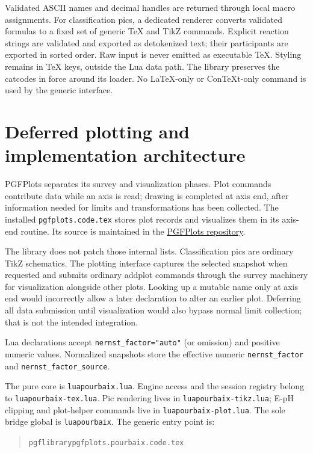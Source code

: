 \documentclass[a4paper,11pt]{ltxdoc}
\begin{document}
Validated ASCII names and decimal handles are returned through local macro
assignments. For classification pics, a dedicated renderer converts validated
formulas to a fixed set of generic TeX and TikZ commands. Explicit reaction strings are validated and exported as detokenized text;
their participants are exported in sorted order. Raw input is never
emitted as executable TeX. Styling remains in TeX keys, outside the Lua data path.
The library preserves the catcodes in force around its loader. No LaTeX-only or
ConTeXt-only command is used by the generic interface.

\section{Deferred plotting and implementation architecture}
PGFPlots separates its survey and visualization phases. Plot commands contribute
data while an axis is read; drawing is completed at axis end, after information
needed for limits and transformations has been collected. The installed
\texttt{pgfplots.code.tex} stores plot records and visualizes them in its axis-end
routine. Its source is maintained in the
\href{https://github.com/pgf-tikz/pgfplots}{PGFPlots repository}.

The library does not patch those internal lists. Classification pics are ordinary
TikZ schematics. The plotting interface captures the selected snapshot when
requested and submits ordinary addplot commands through the survey machinery
for visualization alongside other plots. Looking up a mutable name only
at axis end would incorrectly allow a later declaration to alter an earlier plot.
Deferring all data submission until visualization would also bypass normal limit
collection; that is not the intended integration.

Lua declarations accept \texttt{nernst\_factor="auto"} (or omission) and
positive numeric values. Normalized snapshots store the effective numeric
\texttt{nernst\_factor} and \texttt{nernst\_factor\_source}.

The pure core is \texttt{luapourbaix.lua}. Engine access and the session registry
belong to \texttt{luapourbaix-tex.lua}. Pic rendering lives in
\texttt{luapourbaix-tikz.lua}; E-pH clipping and plot-helper commands live in
\texttt{luapourbaix-plot.lua}. The sole bridge global is \texttt{luapourbaix}.
The generic entry point is:
\begin{quote}
\texttt{pgflibrarypgfplots.pourbaix.code.tex}
\end{quote}
\end{document}
